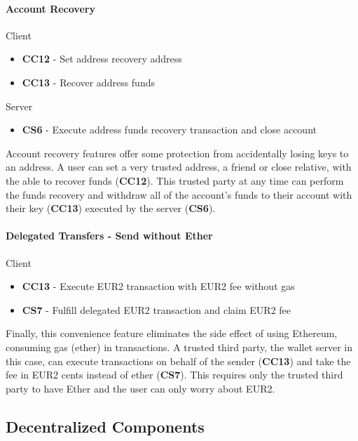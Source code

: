 \documentclass[a4paper,12pt]{article} %
\begin{document}
{{\paragraph{Account Recovery}

Client
\begin{itemize}
	\item \textbf{CC12} - Set address recovery address
	\item \textbf{CC13} - Recover address funds
\end{itemize}

Server
\begin{itemize}
	\item \textbf{CS6} - Execute address funds recovery transaction and close account
\end{itemize}

Account recovery features offer some protection from accidentally losing keys to an address. A user can set a very trusted address, a friend or close relative, with the able to recover funds (\textbf{CC12}). This trusted party at any time can perform the funds recovery and withdraw all of the account's funds to their account with their key (\textbf{CC13}) executed by the server (\textbf{CS6}).

\paragraph{Delegated Transfers - Send without Ether}

Client
\begin{itemize}
	\item \textbf{CC13} - Execute EUR2 transaction with EUR2 fee without gas
\end{itemize}

\begin{itemize}
	\item \textbf{CS7} - Fulfill delegated EUR2 transaction and claim EUR2 fee
\end{itemize}

Finally, this convenience feature eliminates the side effect of using Ethereum, consuming gas (ether) in transactions. A trusted third party, the wallet server in this case, can execute transactions on behalf of the sender (\textbf{CC13}) and take the fee in EUR2 cents instead of ether (\textbf{CS7}). This requires only the trusted third party to have Ether and the user can only worry about EUR2.

\subsection{Decentralized Components} \label{ssec:3.4}

}}
\end{document}
